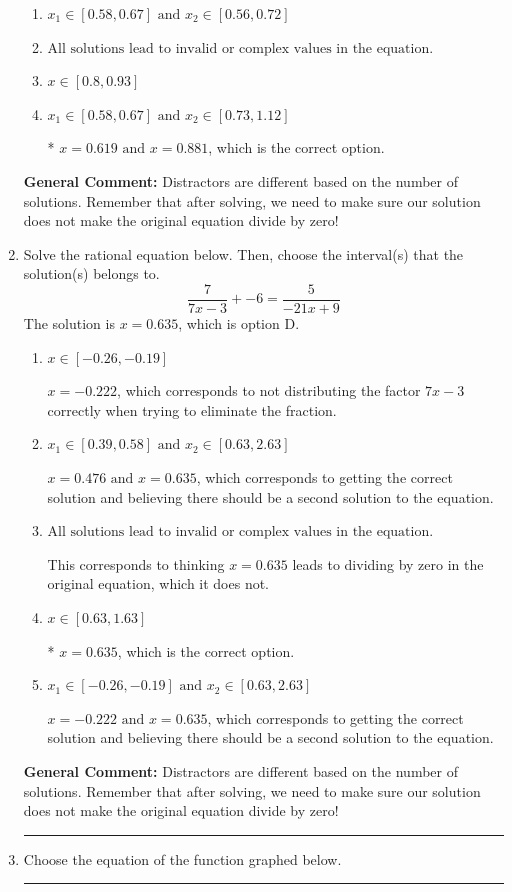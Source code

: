 \documentclass{extbook}[14pt]
\newcommand{\litem}[1]{\item #1

\rule{\textwidth}{0.4pt}}
\begin{document}
\begin{enumerate}
{\begin{enumerate}[label=\Alph*.]
\item \( x_1 \in [0.58, 0.67] \text{ and } x_2 \in [0.56,0.72] \)


\item \( \text{All solutions lead to invalid or complex values in the equation.} \)


\item \( x \in [0.8,0.93] \)


\item \( x_1 \in [0.58, 0.67] \text{ and } x_2 \in [0.73,1.12] \)

* $x = 0.619 \text{ and } x = 0.881$, which is the correct option.
\end{enumerate}

\textbf{General Comment:} Distractors are different based on the number of solutions. Remember that after solving, we need to make sure our solution does not make the original equation divide by zero!
}
\litem{
Solve the rational equation below. Then, choose the interval(s) that the solution(s) belongs to.
\[ \frac{7}{7x -3} + -6 = \frac{5}{-21x + 9} \]The solution is \( x = 0.635 \), which is option D.\begin{enumerate}[label=\Alph*.]
\item \( x \in [-0.26,-0.19] \)

$x = -0.222$, which corresponds to not distributing the factor $7x -3$ correctly when trying to eliminate the fraction.
\item \( x_1 \in [0.39, 0.58] \text{ and } x_2 \in [0.63,2.63] \)

$x = 0.476 \text{ and } x = 0.635$, which corresponds to getting the correct solution and believing there should be a second solution to the equation.
\item \( \text{All solutions lead to invalid or complex values in the equation.} \)

This corresponds to thinking $x = 0.635$ leads to dividing by zero in the original equation, which it does not.
\item \( x \in [0.63,1.63] \)

* $x = 0.635$, which is the correct option.
\item \( x_1 \in [-0.26, -0.19] \text{ and } x_2 \in [0.63,2.63] \)

$x = -0.222 \text{ and } x = 0.635$, which corresponds to getting the correct solution and believing there should be a second solution to the equation.
\end{enumerate}

\textbf{General Comment:} Distractors are different based on the number of solutions. Remember that after solving, we need to make sure our solution does not make the original equation divide by zero!
}
\litem{
Choose the equation of the function graphed below.

}
\end{enumerate}
\end{document}
